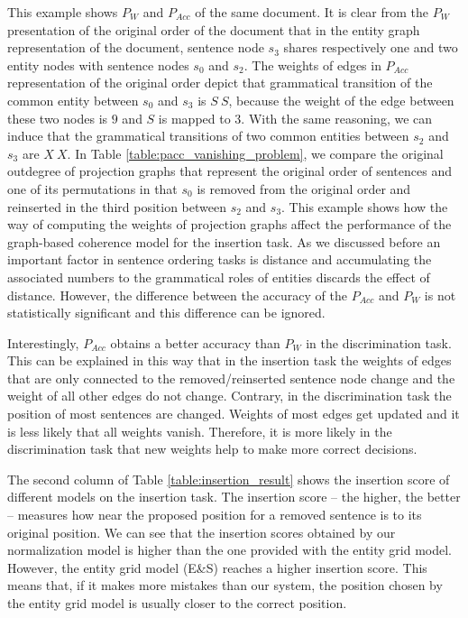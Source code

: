 This example shows $P_W$ and $P_{Acc}$ of the same document. 
It is clear from the $P_W$ presentation of the original order of the document that in the entity graph representation of the document, sentence node $s_3$ shares respectively one and two entity nodes with sentence nodes $s_0$ and $s_2$. 
The weights of edges in $P_{Acc}$ representation of the original order depict that grammatical transition of the common entity between $s_0$ and $s_3$ is $S\ S$, because the weight of the edge between these two nodes is $9$ and $S$ is mapped to $3$. 
With the same reasoning, we can induce that the grammatical transitions of two common entities between $s_2$ and $s_3$ are $X\ X$. 
In Table \ref{table:pacc_vanishing_problem}, we compare the original outdegree of projection graphs that represent the original order of sentences and one of its permutations in that $s_0$ is removed from the original order and reinserted in the third position between $s_2$ and $s_3$. 
This example shows how the way of computing the weights of projection graphs affect the performance of the graph-based coherence model for the insertion task. 
As we discussed before an important factor in sentence ordering tasks is distance and 
 accumulating the associated numbers to the grammatical roles of entities discards the effect of distance. 
However, the difference between the accuracy of the $P_{Acc}$ and $P_{W}$ is not statistically significant and this difference can be ignored. 

Interestingly, $P_{Acc}$ obtains a better accuracy than $P_W$ in the discrimination task. 
This can be explained in this way that in the insertion task the weights of edges that are only connected to the removed/reinserted sentence node change and the weight of all other edges do not change. 
Contrary, in the discrimination task the position of most sentences are changed. 
Weights of most edges get updated and it is less likely that all weights vanish.
Therefore, it is more likely in the discrimination task that new weights help to make more correct decisions. 


The second column of Table \ref{table:insertion_result} shows the insertion score of different models on the insertion task. 
The insertion score -- the higher, the better -- measures how near the proposed position for a removed sentence is to its original position. 
We can see that the insertion scores obtained by our normalization model is higher than the one provided with the entity grid model.
However, the entity grid model (E\&S) reaches a higher insertion score. 
This means that, if it makes more mistakes than our system, the position chosen by the entity grid model is usually closer to the correct position. 


